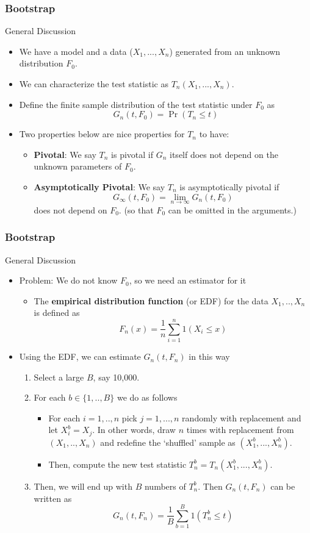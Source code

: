 \documentclass{beamer}
\begin{document}
\begin{frame}
\frametitle{Bootstrap}
General Discussion
\begin{itemize}
\item We have a model and a data ($X_1,...,X_n$) generated from an unknown distribution $F_0$. 
\item We can characterize the test statistic as $T_n(X_1,...,X_n)$. 
\item Define the finite sample distribution of the test statistic under $F_0$ as
\[
G_n(t,F_0) = \Pr(T_n\leq t)
\]
\item Two properties below are nice properties for $T_n$ to have:
\begin{itemize}
\item \textbf{Pivotal}: We say $T_n$ is pivotal if $G_n$ itself does not depend on the unknown parameters of $F_0$. 
\item \textbf{Asymptotically Pivotal}: We say $T_n$ is asymptotically pivotal if 
\[
G_\infty(t,F_0)=\lim_{n\to\infty}G_n(t,F_0)
\]
 does not depend on $F_0$. (so that $F_0$ can be omitted in the arguments.)
\end{itemize}
\end{itemize}
\end{frame}

\begin{frame}
\frametitle{Bootstrap}
General Discussion
\begin{itemize}
\item Problem: We do not know $F_0$, so we need an estimator for it 
\begin{itemize}
\item The \textbf{empirical distribution function} (or EDF) for the data $X_1,..,X_n$ is defined as
\[
F_n(x) = \frac{1}{n}\sum_{i=1}^n 1(X_i\leq x)
\]
\end{itemize}
\item Using the EDF, we can estimate $G_n(t, F_n)$ in this way
\begin{enumerate}
\item Select a large $B$, say 10,000. 
\item For each $b\in\{1,..,B\}$ we do as follows
\begin{itemize}
\item For each $i=1,..,n$ pick $j=1,...,n$ randomly with replacement and let $X_i^b= X_j$. In other words, draw $n$ times with replacement from $(X_1,..,X_n)$ and redefine the `shuffled' sample as $(X_1^b,...,X_n^b)$. 
\item Then, compute the new test statistic $T_n^b=T_n(X_1^b,...,X_n^b)$. 
\end{itemize}
\item Then, we will end up with $B$ numbers of $T_n^b$. Then $G_n(t,F_n)$ can be written as
\[
G_n(t,F_n) = \frac{1}{B}\sum_{b=1}^B 1(T_n^b\leq t)
\]
\end{enumerate}
\end{itemize}
\end{frame}
\end{document}
